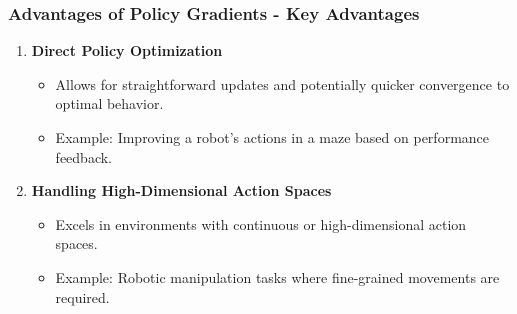 \documentclass[aspectratio=169]{beamer}
\begin{document}
\begin{frame}[fragile]
    \frametitle{Advantages of Policy Gradients - Key Advantages}
    \begin{enumerate}
        \item \textbf{Direct Policy Optimization}
            \begin{itemize}
                \item Allows for straightforward updates and potentially quicker convergence to optimal behavior.
                \item Example: Improving a robot's actions in a maze based on performance feedback.
            \end{itemize}
        
        \item \textbf{Handling High-Dimensional Action Spaces}
            \begin{itemize}
                \item Excels in environments with continuous or high-dimensional action spaces.
                \item Example: Robotic manipulation tasks where fine-grained movements are required.
            \end{itemize}
    \end{enumerate}
\end{frame}
\end{document}
